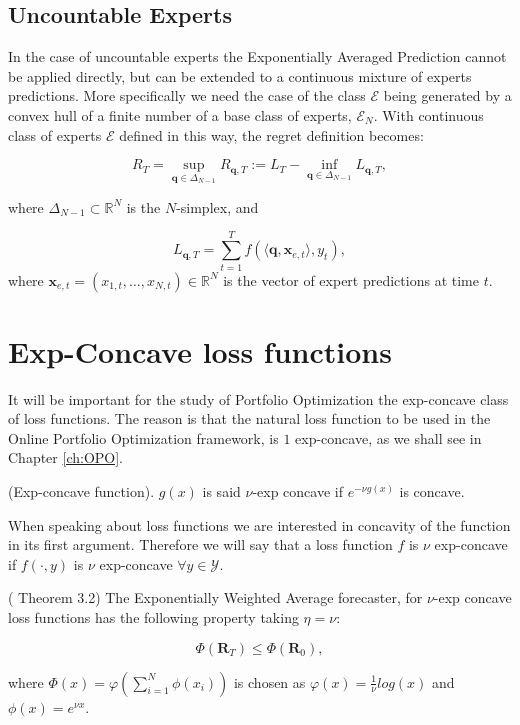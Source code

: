 \subsection{Uncountable Experts}\label{sec:uncountable_exp}

In the case of uncountable experts the Exponentially Averaged Prediction cannot be applied directly, but can be extended to a continuous mixture of experts predictions. More specifically we need the case of the class $\mathcal E$ being generated by a convex hull of a finite number of a base class of experts, $\mathcal E_N$.
With continuous class of experts $\mathcal E$ defined in this way, the regret definition becomes:

\begin{equation}
    R_T = \sup\limits_{\mathbf q\in\Delta_{N-1}}R_{\mathbf q,T}:=L_T-\inf\limits_{\mathbf q\in\Delta_{N-1}}L_{\mathbf q,T},
\end{equation}

where $\Delta_{N-1}\subset \mathbb R^{N}$ is the $N$-simplex, and 

$$L_{\mathbf q,T}=\sum\limits_{t=1}^T f(\langle \mathbf q,\mathbf x_{e,t}\rangle,y_t),$$
where $\mathbf x_{e,t}=(x_{1,t},\ldots,x_{N,t})\in\mathbb R^N$ is the vector of expert predictions at time $t$.


\section{Exp-Concave loss functions}\label{sec:exp-concave-mixture}

It will be important for the study of Portfolio Optimization the exp-concave class of loss functions. The reason is that the natural loss function to be used in the Online Portfolio Optimization framework, is $1$ exp-concave, as we shall see in Chapter \ref{ch:OPO}.

\begin{definition}(Exp-concave function). 
$g(x)$ is said $\nu$-exp concave if $e^{-\nu g(x)}$ is concave.
\end{definition}

When speaking about loss functions we are interested in concavity of the function in its first argument. Therefore we will say that a loss function $f$ is $\nu$ exp-concave if $f(\cdot,y)$ is $\nu$ exp-concave $\forall y\in\mathcal Y$. 

\begin{theorem}\label{th:General_Blk}(\cite{cesa2006prediction} Theorem 3.2)
The Exponentially Weighted Average forecaster, for $\nu$-exp concave loss functions has the following property taking $\eta=\nu$:

$$\Phi(\mathbf R_T)\le \Phi(\mathbf R_0),$$

where $\Phi(x)=\varphi\left(\sum\limits_{i=1}^N\phi(x_i)\right)$ is chosen as $\varphi(x)=\frac{1}{\nu}log(x)$ and $\phi(x)=e^{\nu x}.$

\end{theorem}

